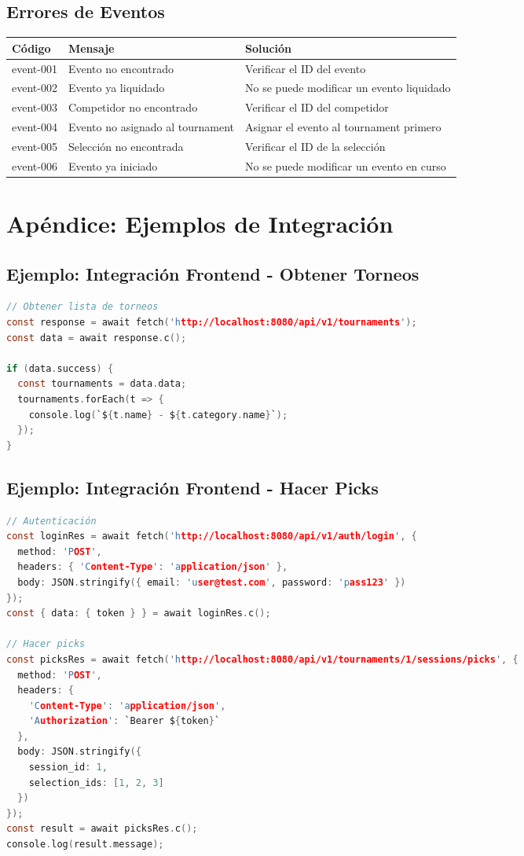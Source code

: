 \documentclass[12pt,a4paper]{article}
\begin{document}
\subsection{Errores de Eventos}
\begin{tabular}{|l|l|p{8cm}|}
\hline
\textbf{Código} & \textbf{Mensaje} & \textbf{Solución} \\
\hline
event-001 & Evento no encontrado & Verificar el ID del evento \\
event-002 & Evento ya liquidado & No se puede modificar un evento liquidado \\
event-003 & Competidor no encontrado & Verificar el ID del competidor \\
event-004 & Evento no asignado al tournament & Asignar el evento al tournament primero \\
event-005 & Selección no encontrada & Verificar el ID de la selección \\
event-006 & Evento ya iniciado & No se puede modificar un evento en curso \\
\end{tabular}

\newpage

\section{Apéndice: Ejemplos de Integración}

\subsection{Ejemplo: Integración Frontend - Obtener Torneos}
\begin{lstlisting}[language=c]
// Obtener lista de torneos
const response = await fetch('http://localhost:8080/api/v1/tournaments');
const data = await response.c();

if (data.success) {
  const tournaments = data.data;
  tournaments.forEach(t => {
    console.log(`${t.name} - ${t.category.name}`);
  });
}
\end{lstlisting}

\subsection{Ejemplo: Integración Frontend - Hacer Picks}
\begin{lstlisting}[language=c]
// Autenticación
const loginRes = await fetch('http://localhost:8080/api/v1/auth/login', {
  method: 'POST',
  headers: { 'Content-Type': 'application/json' },
  body: JSON.stringify({ email: 'user@test.com', password: 'pass123' })
});
const { data: { token } } = await loginRes.c();

// Hacer picks
const picksRes = await fetch('http://localhost:8080/api/v1/tournaments/1/sessions/picks', {
  method: 'POST',
  headers: { 
    'Content-Type': 'application/json',
    'Authorization': `Bearer ${token}`
  },
  body: JSON.stringify({
    session_id: 1,
    selection_ids: [1, 2, 3]
  })
});
const result = await picksRes.c();
console.log(result.message);
\end{lstlisting}
\end{document}
